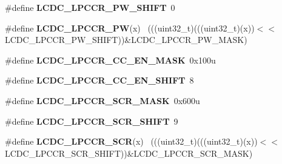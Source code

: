 \begin{DoxyCompactItemize}
\item 
\hypertarget{group___l_c_d_c___register___masks_ga7fbbc00e882493ec586cd275a5233aa5}{}\#define {\bfseries L\+C\+D\+C\+\_\+\+L\+P\+C\+C\+R\+\_\+\+P\+W\+\_\+\+S\+H\+I\+F\+T}~0\label{group___l_c_d_c___register___masks_ga7fbbc00e882493ec586cd275a5233aa5}

\item 
\hypertarget{group___l_c_d_c___register___masks_gae30f9b99e00d08e96873aa41b9d4262d}{}\#define {\bfseries L\+C\+D\+C\+\_\+\+L\+P\+C\+C\+R\+\_\+\+P\+W}(x)                                              ~(((uint32\+\_\+t)(((uint32\+\_\+t)(x))$<$$<$L\+C\+D\+C\+\_\+\+L\+P\+C\+C\+R\+\_\+\+P\+W\+\_\+\+S\+H\+I\+F\+T))\&L\+C\+D\+C\+\_\+\+L\+P\+C\+C\+R\+\_\+\+P\+W\+\_\+\+M\+A\+S\+K)\label{group___l_c_d_c___register___masks_gae30f9b99e00d08e96873aa41b9d4262d}

\item 
\hypertarget{group___l_c_d_c___register___masks_ga53423e53de432c4cfe39144bcb4d1eb7}{}\#define {\bfseries L\+C\+D\+C\+\_\+\+L\+P\+C\+C\+R\+\_\+\+C\+C\+\_\+\+E\+N\+\_\+\+M\+A\+S\+K}~0x100u\label{group___l_c_d_c___register___masks_ga53423e53de432c4cfe39144bcb4d1eb7}

\item 
\hypertarget{group___l_c_d_c___register___masks_gaa479e97d00606492f3f6275413162362}{}\#define {\bfseries L\+C\+D\+C\+\_\+\+L\+P\+C\+C\+R\+\_\+\+C\+C\+\_\+\+E\+N\+\_\+\+S\+H\+I\+F\+T}~8\label{group___l_c_d_c___register___masks_gaa479e97d00606492f3f6275413162362}

\item 
\hypertarget{group___l_c_d_c___register___masks_ga79b92d32944fa9f8a2a3b66de1658bb1}{}\#define {\bfseries L\+C\+D\+C\+\_\+\+L\+P\+C\+C\+R\+\_\+\+S\+C\+R\+\_\+\+M\+A\+S\+K}~0x600u\label{group___l_c_d_c___register___masks_ga79b92d32944fa9f8a2a3b66de1658bb1}

\item 
\hypertarget{group___l_c_d_c___register___masks_gad10962979917a7a0bc9c6387ca774596}{}\#define {\bfseries L\+C\+D\+C\+\_\+\+L\+P\+C\+C\+R\+\_\+\+S\+C\+R\+\_\+\+S\+H\+I\+F\+T}~9\label{group___l_c_d_c___register___masks_gad10962979917a7a0bc9c6387ca774596}

\item 
\hypertarget{group___l_c_d_c___register___masks_gae41c85ce12efe7b23af08eb6a9bba27c}{}\#define {\bfseries L\+C\+D\+C\+\_\+\+L\+P\+C\+C\+R\+\_\+\+S\+C\+R}(x)                                            ~(((uint32\+\_\+t)(((uint32\+\_\+t)(x))$<$$<$L\+C\+D\+C\+\_\+\+L\+P\+C\+C\+R\+\_\+\+S\+C\+R\+\_\+\+S\+H\+I\+F\+T))\&L\+C\+D\+C\+\_\+\+L\+P\+C\+C\+R\+\_\+\+S\+C\+R\+\_\+\+M\+A\+S\+K)\label{group___l_c_d_c___register___masks_gae41c85ce12efe7b23af08eb6a9bba27c}


\end{DoxyCompactItemize}
